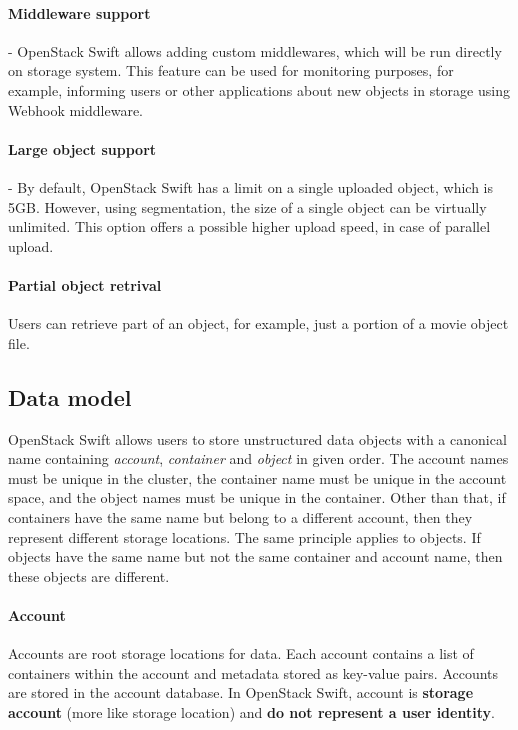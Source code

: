     \paragraph{Middleware support}
    - OpenStack Swift allows adding custom middlewares, which will be run directly on storage system\cite{swiftEssentials}. This feature can be used for monitoring purposes, for example, informing users or other applications about new objects in storage using Webhook middleware.

    \paragraph{Large object support}
    - By default, OpenStack Swift has a limit on a single uploaded object, which is 5GB. However, using segmentation, the size of a single object can be virtually unlimited. This option offers a possible higher upload speed, in case of parallel upload\cite{swiftLOS}.

    \paragraph{Partial object retrival}
    Users can retrieve part of an object, for example, just a portion of a movie object file\cite{swiftImplementingCloudStorage}.

    \subsection{Data model}
    OpenStack Swift allows users to store unstructured data objects with a canonical name containing \textit{account}, \textit{container} and \textit{object} in given order\cite{swiftOpenStackSwift}. The account names must be unique in the cluster, the container name must be unique in the account space, and the object names must be unique in the container. Other than that, if containers have the same name but belong to a different account, then they represent different storage locations. The same principle applies to objects. If objects have the same name but not the same container and account name, then these objects are different.

    \paragraph{Account}
    Accounts are root storage locations for data. Each account contains a list of containers within the account and metadata stored as key-value pairs. Accounts are stored in the account database. In OpenStack Swift, account is \textbf{storage account} (more like storage location) and \textbf{do not represent a user identity}\cite{swiftOpenStackSwift}.

